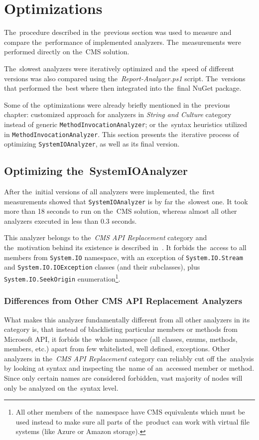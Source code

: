 \documentclass[
  digital, %
  table,   %
  lof,     %
  lot,     %
  oneside,
]{fithesis3}
\begin{document}
\section{Optimizations}
The~procedure described in the~previous section was used to measure and compare the~performance of implemented analyzers. The~measurements were performed directly on the~CMS solution.

The~slowest analyzers were iteratively optimized and the~speed of different versions was also compared using the~\textit{Report-Analyzer.ps1} script. The~versions that performed the~best where then integrated into the~final NuGet package.

Some of the~optimizations were already briefly mentioned in the~previous chapter: customized approach for analyzers in \textit{String and Culture} category instead of generic \texttt{MethodInvocationAnalyzer}; or the~syntax heuristics utilized in \texttt{MethodInvocationAnalyzer}. This section presents the~iterative process of optimizing \texttt{SystemIOAnalyzer}, as well as its final version.

\subsection{Optimizing the~SystemIOAnalyzer}
After the~initial versions of all analyzers were implemented, the~first measurements showed that \texttt{SystemIOAnalyzer} is by far the~slowest one. It took more than 18 seconds to run on the~CMS solution, whereas almost all other analyzers executed in less than 0.3 seconds.

This analyzer belongs to the~\textit{CMS API Replacement} category and the~motivation behind its existence is described in~\cite{system-io-motivation}. It forbids the~access to all members from \texttt{System.IO} namespace, with an exception of \texttt{System.IO.Stream} and \texttt{System.IO.IOException} classes (and their subclasses), plus \texttt{System.IO.SeekOrigin} enumeration\footnote{All other members of the~namespace have CMS equivalents which must be used instead to make sure all parts of the~product can work with virtual file systems (like  Azure or Amazon storage).}.

\subsubsection{\textbf{Differences from Other CMS API Replacement Analyzers}}
What makes this analyzer fundamentally different from all other analyzers in its category is, that instead of blacklisting particular members or methods from Microsoft API, it forbids the~whole namespace (all classes, enums, methods, members, etc.) apart from few whitelisted, well defined, exceptions. Other analyzers in the~\textit{CMS API Replacement} category can reliably cut off the~analysis by looking at syntax and inspecting the~name of an~accessed member or method. Since only certain names are considered forbidden, vast majority of nodes will only be analyzed on the~syntax level. 
\end{document}
